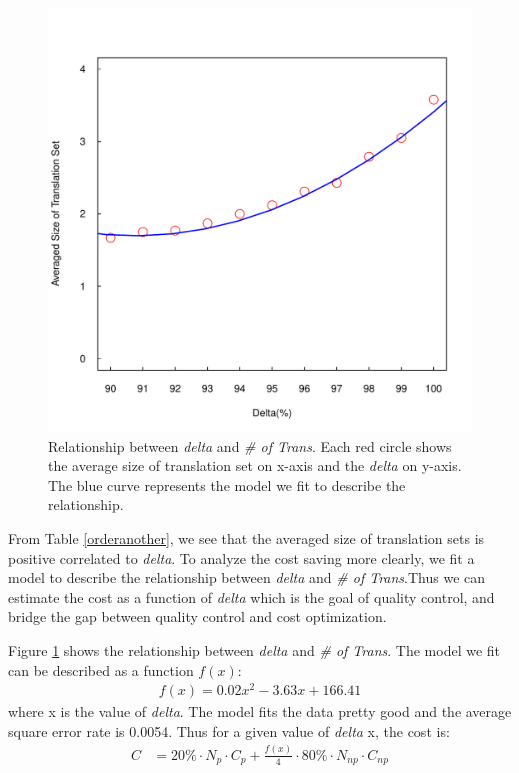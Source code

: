 \documentclass[11pt]{article}
\begin{document}
\begin{figure}[h!]
  \centering
  \includegraphics[width=\linewidth]{fitsizedelta/fit.pdf}
  \caption{Relationship between \textit{delta} and \textit{\# of Trans}. Each red circle shows the average size of translation set on x-axis and the \textit{delta} on y-axis. The blue curve represents the model we fit to describe the relationship.}
    \label{fit}
\end{figure}

From Table \ref{orderanother}, we see that the averaged size of translation sets is positive correlated to \textit{delta}. To analyze the cost saving more clearly, we fit a model to describe the relationship between \textit{delta} and \textit{\# of Trans}.Thus we can estimate the cost as a function of \textit{delta} which is the goal of  quality control, and bridge the gap between quality control and cost optimization.

Figure \ref{fit} shows the relationship between \textit{delta} and \textit{\# of Trans}. The model we fit can be described as a function $f(x)$:
\begin{align*}
f(x) = 0.02x^2 - 3.63x+166.41
\end{align*}
 where x is the value of \textit{delta}. The model fits the data pretty good and the average square error rate is 
0.0054. Thus for a given value of \textit{delta} x, the cost is:
\begin{align*}
C& = 20\% \cdot N_{p}\cdot C_{p}  +  \frac{f(x)}{4}\cdot 80\% \cdot N_{np} \cdot C_{np}\\
\end{align*} 
\end{document}
